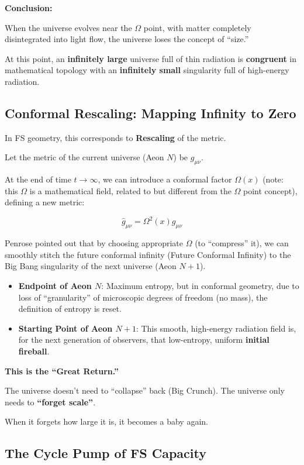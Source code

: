 \textbf{Conclusion:}

When the universe evolves near the $\Omega$ point, with matter completely disintegrated into light flow, the universe loses the concept of ``size.''

At this point, an \textbf{infinitely large} universe full of thin radiation is \textbf{congruent} in mathematical topology with an \textbf{infinitely small} singularity full of high-energy radiation.

\subsection{Conformal Rescaling: Mapping Infinity to Zero}

In FS geometry, this corresponds to \textbf{Rescaling} of the metric.

Let the metric of the current universe (Aeon $N$) be $g_{\mu\nu}$.

At the end of time $t \to \infty$, we can introduce a conformal factor $\Omega(x)$ (note: this $\Omega$ is a mathematical field, related to but different from the $\Omega$ point concept), defining a new metric:

\[\hat{g}_{\mu\nu} = \Omega^2(x) g_{\mu\nu}\]

Penrose pointed out that by choosing appropriate $\Omega$ (to ``compress'' it), we can smoothly stitch the future conformal infinity (Future Conformal Infinity) to the Big Bang singularity of the next universe (Aeon $N+1$).

\begin{itemize}
\item \textbf{Endpoint of Aeon $N$}: Maximum entropy, but in conformal geometry, due to loss of ``granularity'' of microscopic degrees of freedom (no mass), the definition of entropy is reset.

\item \textbf{Starting Point of Aeon $N+1$}: This smooth, high-energy radiation field is, for the next generation of observers, that low-entropy, uniform \textbf{initial fireball}.
\end{itemize}

\textbf{This is the ``Great Return.''}

The universe doesn't need to ``collapse'' back (Big Crunch). The universe only needs to \textbf{``forget scale''}.

When it forgets how large it is, it becomes a baby again.

\subsection{The Cycle Pump of FS Capacity}

